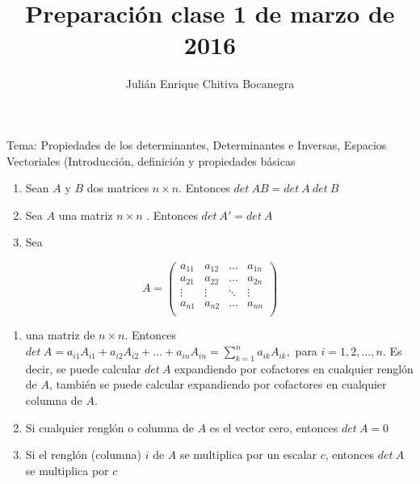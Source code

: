 \documentclass[
]{article}
\title{Preparación clase 1 de marzo de 2016}
\author{Julián Enrique Chitiva Bocanegra}
\date{}
\begin{document}
\maketitle

Tema: Propiedades de los determinantes, Determinantes e Inversas,
Espacios Vectoriales (Introducción, definición y propiedades básicas

\begin{enumerate}
\def\labelenumi{\arabic{enumi}.}
\item
  Sean \(A\) y \(B\) dos matrices \(n \times n\). Entonces
  \(det\ AB = det\ A\ det\ B\)
\item
  Sea \(A\) una matriz \(n \times n\) . Entonces
  \(det\ A\prime = det\ A\)
\item
  Sea
\end{enumerate}

\[A = \begin{pmatrix}
a_{11} & a_{12} & \ldots & a_{1n} \\
a_{21} & a_{22} & \ldots & a_{2n} \\
 \vdots & \vdots & \ddots & \vdots \\
a_{n1} & a_{n2} & \ldots & a_{nn} \\
\end{pmatrix}\]

\begin{enumerate}
\def\labelenumi{\arabic{enumi}.}
\setcounter{enumi}{3}
\item
  una matriz de \(n \times n\). Entonces
  \(det\ A = a_{i1}A_{i1} + a_{i2}A_{i2} + \ldots + a_{in}A_{in} = \sum_{k = 1}^{n}a_{ik}A_{ik},\)
  para \(i = 1,2,\ldots,n\). Es decir, se puede calcular \(det\ A\)
  expandiendo por cofactores en cualquier renglón de \(A\), también se
  puede calcular expandiendo por cofactores en cualquier columna de
  \(A\).
\item
  Si cualquier renglón o columna de \(A\) es el vector cero, entonces
  \(det\ A = 0\)
\item
  Si el renglón (columna) \(i\) de \(A\) se multiplica por un escalar
  \(c\), entonces \(det\ A\) se multiplica por \(c\)
\end{enumerate}
\end{document}
